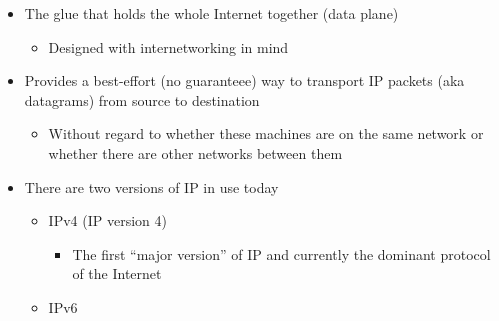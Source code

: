 \begin{itemize}
    \begin{itemize}

      \item The glue that holds the whole Internet together (data plane)

        \begin{itemize}

          \item Designed with internetworking in mind

        \end{itemize}

      \item Provides a best-effort (no guaranteee) way to transport IP packets (aka datagrams) from source to destination

        \begin{itemize}

          \item Without regard to whether these machines are on the same network or whether there are other networks between them

        \end{itemize}

      \item There are two versions of IP in use today

        \begin{itemize}

          \item IPv4 (IP version 4)

            \begin{itemize}

              \item The first ``major version'' of IP and currently the dominant protocol of the Internet

            \end{itemize}

          \item IPv6

        \end{itemize}

    \end{itemize}

\end{itemize}



